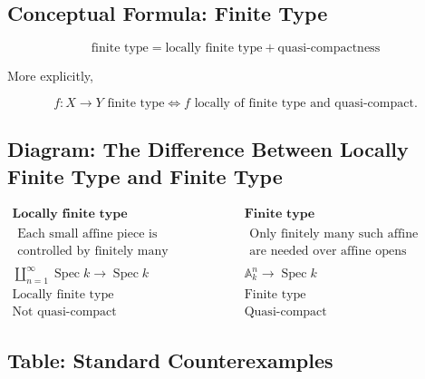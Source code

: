 \documentclass[12pt,a4paper]{article}
\theoremstyle{notespace}
\begin{document}
\subsection{Conceptual Formula: Finite Type}

\[
\boxed{
	\text{finite type}
	=
	\text{locally finite type}
	+
	\text{quasi-compactness}
}
\]

More explicitly,

\[
\boxed{
	f:X\to Y \text{ finite type}
	\iff
	f \text{ locally of finite type and quasi-compact}.
}
\]

\subsection{Diagram: The Difference Between Locally Finite Type and Finite Type}

\[
\begin{array}{c|c}
	\textbf{Locally finite type} & \textbf{Finite type}
	\\
	\hline
	\begin{array}{c}
		\text{Each small affine piece is} \\
		\text{controlled by finitely many generators}
	\end{array}
	&
	\begin{array}{c}
		\text{Only finitely many such affine pieces} \\
		\text{are needed over affine opens}
	\end{array}
	\\[2em]
	\coprod_{n=1}^{\infty}\operatorname{Spec}k
	\to
	\operatorname{Spec}k
	&
	\mathbb{A}^n_k
	\to
	\operatorname{Spec}k
	\\[2em]
	\text{Locally finite type}
	&
	\text{Finite type}
	\\
	\text{Not quasi-compact}
	&
	\text{Quasi-compact}
\end{array}
\]

\subsection{Table: Standard Counterexamples}
\end{document}

